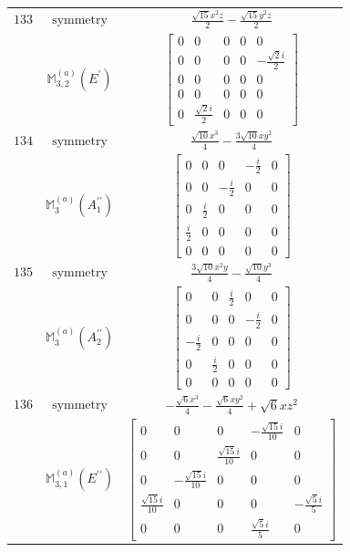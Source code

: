\documentclass[fleqn,8pt,landscape]{jsarticle}
\begin{document}
\begin{longtable}{ccc}
$ 133 $ & $ \text{symmetry} $ & $ \frac{\sqrt{15} x^{2} z}{2} - \frac{\sqrt{15} y^{2} z}{2} $ \\
$  $ & $ \mathbb{M}_{3,2}^{(a)}(E^{\prime}) $ & $ \begin{bmatrix} 0 & 0 & 0 & 0 & 0 \\ 0 & 0 & 0 & 0 & - \frac{\sqrt{2} i}{2} \\ 0 & 0 & 0 & 0 & 0 \\ 0 & 0 & 0 & 0 & 0 \\ 0 & \frac{\sqrt{2} i}{2} & 0 & 0 & 0 \end{bmatrix} $ \\ \hline
$ 134 $ & $ \text{symmetry} $ & $ \frac{\sqrt{10} x^{3}}{4} - \frac{3 \sqrt{10} x y^{2}}{4} $ \\
$  $ & $ \mathbb{M}_{3}^{(a)}(A_{1}^{\prime\prime}) $ & $ \begin{bmatrix} 0 & 0 & 0 & - \frac{i}{2} & 0 \\ 0 & 0 & - \frac{i}{2} & 0 & 0 \\ 0 & \frac{i}{2} & 0 & 0 & 0 \\ \frac{i}{2} & 0 & 0 & 0 & 0 \\ 0 & 0 & 0 & 0 & 0 \end{bmatrix} $ \\ \hline
$ 135 $ & $ \text{symmetry} $ & $ \frac{3 \sqrt{10} x^{2} y}{4} - \frac{\sqrt{10} y^{3}}{4} $ \\
$  $ & $ \mathbb{M}_{3}^{(a)}(A_{2}^{\prime\prime}) $ & $ \begin{bmatrix} 0 & 0 & \frac{i}{2} & 0 & 0 \\ 0 & 0 & 0 & - \frac{i}{2} & 0 \\ - \frac{i}{2} & 0 & 0 & 0 & 0 \\ 0 & \frac{i}{2} & 0 & 0 & 0 \\ 0 & 0 & 0 & 0 & 0 \end{bmatrix} $ \\ \hline
$ 136 $ & $ \text{symmetry} $ & $ - \frac{\sqrt{6} x^{3}}{4} - \frac{\sqrt{6} x y^{2}}{4} + \sqrt{6} x z^{2} $ \\
$  $ & $ \mathbb{M}_{3,1}^{(a)}(E^{\prime\prime}) $ & $ \begin{bmatrix} 0 & 0 & 0 & - \frac{\sqrt{15} i}{10} & 0 \\ 0 & 0 & \frac{\sqrt{15} i}{10} & 0 & 0 \\ 0 & - \frac{\sqrt{15} i}{10} & 0 & 0 & 0 \\ \frac{\sqrt{15} i}{10} & 0 & 0 & 0 & - \frac{\sqrt{5} i}{5} \\ 0 & 0 & 0 & \frac{\sqrt{5} i}{5} & 0 \end{bmatrix} $ \\ \hline

\end{longtable}
\end{document}
